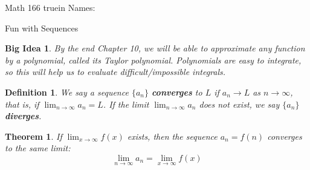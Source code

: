 \documentclass[12pt]{article}
\newtheorem*{theorem}{Theorem}
\newtheorem*{bigidea}{Big Idea}
\newtheorem*{defn}{Definition}
\begin{document}
\thispagestyle{empty} %

\noindent
{Math 166  truein  Names:\ \hrulefill}


\noindent
{Fun with Sequences }

\begin{bigidea} \rm
By the end Chapter 10, we will be able to approximate \emph{any function} by a polynomial, called its \emph{Taylor polynomial}. Polynomials are easy to integrate, so this will help us to evaluate difficult/impossible integrals.
\end{bigidea}



\begin{defn} \rm
We say a sequence $\{a_n\}$ \textbf{converges} to $L$ if $a_n\rightarrow L$ as $n\rightarrow\infty$, that is, if $\displaystyle\lim_{n\rightarrow\infty} a_n=L$. If the limit $\displaystyle\lim_{n\rightarrow\infty} a_n$ does not exist, we say $\{a_n\}$ \textbf{diverges}.
\end{defn}

\begin{theorem}
If $\displaystyle\lim_{x\rightarrow\infty}f(x)$ exists, then the sequence $a_n=f(n)$ converges to the same limit: \[\displaystyle\lim_{n\rightarrow\infty}a_n=\displaystyle\lim_{x\rightarrow\infty}f(x)\]
\end{theorem}
\end{document}
